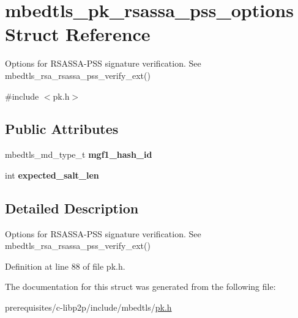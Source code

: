 \hypertarget{structmbedtls__pk__rsassa__pss__options}{}\section{mbedtls\+\_\+pk\+\_\+rsassa\+\_\+pss\+\_\+options Struct Reference}
\label{structmbedtls__pk__rsassa__pss__options}


Options for R\+S\+A\+S\+S\+A-\/\+P\+SS signature verification. See {\ttfamily mbedtls\+\_\+rsa\+\_\+rsassa\+\_\+pss\+\_\+verify\+\_\+ext()}  




{\ttfamily \#include $<$pk.\+h$>$}

\subsection*{Public Attributes}
\begin{DoxyCompactItemize}
\item 
\mbox{\label{structmbedtls__pk__rsassa__pss__options_ab5ca5b88636ad6db1af4a67ddf748606}} 
mbedtls\+\_\+md\+\_\+type\+\_\+t {\bfseries mgf1\+\_\+hash\+\_\+id}
\item 
\mbox{\label{structmbedtls__pk__rsassa__pss__options_a7d820886502754155458ba3d846f577d}} 
int {\bfseries expected\+\_\+salt\+\_\+len}
\end{DoxyCompactItemize}


\subsection{Detailed Description}
Options for R\+S\+A\+S\+S\+A-\/\+P\+SS signature verification. See {\ttfamily mbedtls\+\_\+rsa\+\_\+rsassa\+\_\+pss\+\_\+verify\+\_\+ext()} 

Definition at line 88 of file pk.\+h.



The documentation for this struct was generated from the following file\+:\begin{DoxyCompactItemize}
\item 
prerequisites/c-\/libp2p/include/mbedtls/\mbox{\hyperlink{pk_8h}{pk.\+h}}\end{DoxyCompactItemize}
